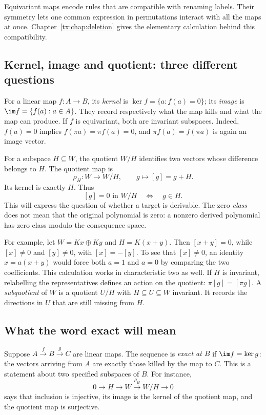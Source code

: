 \documentclass[11pt,a4paper,oneside,openany]{book}
\theoremstyle{definition}\newtheorem{definition}[theorem]{Definition}
\theoremstyle{remark}\newtheorem{remark}[theorem]{Remark}
\numberwithin{equation}{chapter}
\begin{document}
Equivariant maps encode rules that are compatible with renaming labels.
Their symmetry lets one common expression in permutations interact
with all the maps at once. Chapter~\ref{tx:chap:deletion} gives the
elementary calculation behind this compatibility.

\subsection{Kernel, image and quotient: three different questions}
For a linear map $f:A\to B$, its \emph{kernel} is
$\ker f=\{a:f(a)=0\}$; its \emph{image} is
$\im f=\{f(a):a\in A\}$. They record respectively what the map kills
and what the map can produce. If $f$ is equivariant, both are invariant
subspaces. Indeed, $f(a)=0$ implies $f(\pi a)=\pi f(a)=0$, and
$\pi f(a)=f(\pi a)$ is again an image vector.

For a subspace $H\subseteq W$, the quotient $W/H$ identifies two
vectors whose difference belongs to $H$. The quotient map is
\[
                  \rho_H:W\to W/H,\qquad g\mapsto[g]=g+H.
\]
Its kernel is exactly $H$. Thus
\[
                         [g]=0\text{ in }W/H
                              \quad\Longleftrightarrow\quad g\in H.
\]
This will express the question of whether a target is derivable.
The zero \emph{class} does not mean that the original polynomial is
zero: a nonzero derived polynomial has zero class modulo the
consequence space.

For example, let $W=Kx\oplus Ky$ and $H=K(x+y)$. Then
$[x+y]=0$, while $[x]\ne0$ and $[y]\ne0$, with $[x]=-[y]$.
To see that $[x]\ne0$, an identity $x=a(x+y)$ would force both
$a=1$ and $a=0$ by comparing the two coefficients.
This calculation works in characteristic two as well.
If $H$ is invariant, relabelling the representatives defines an action
on the quotient: $\pi[g]=[\pi g]$.
A \emph{subquotient} of $W$ is a quotient $U/H$ with
$H\subseteq U\subseteq W$ invariant. It records the directions in
$U$ that are still missing from $H$.

\subsection{What the word exact will mean}
Suppose $A\xrightarrow{f}B\xrightarrow{g}C$ are linear maps.
The sequence is \emph{exact at $B$} if $\im f=\ker g$:
the vectors arriving from $A$ are exactly those killed by the map to
$C$. This is a statement about two specified subspaces of $B$.
For instance,
\[
        0\longrightarrow H\longrightarrow W
                      \xrightarrow{\rho_H}W/H\longrightarrow0
\]
says that inclusion is injective, its image is the kernel of the
quotient map, and the quotient map is surjective.
\end{document}
